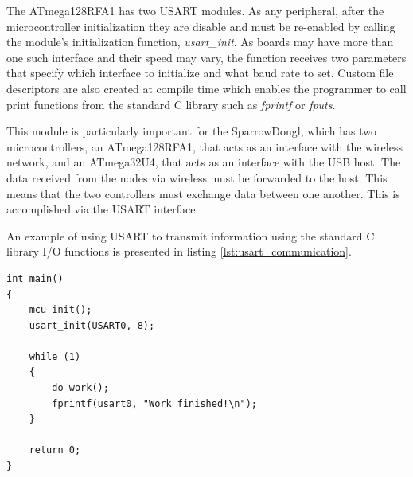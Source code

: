 The \mbox{ATmega128RFA1} has two USART modules. As any peripheral, after the
microcontroller initialization they are disable and must be re-enabled by
calling the module's initialization function, \emph{usart\_init}. As boards may
have more than one such interface and their speed may vary, the function
receives two parameters that specify which interface to initialize and what
baud rate to set. Custom file descriptors are also created at compile time
which enables the programmer to call print functions from the standard C
library such as \emph{fprintf} or \emph{fputs}.

This module is particularly important for the SparrowDongl, which has two
microcontrollers, an \mbox{ATmega128RFA1}, that acts as an interface with the
wireless network, and an \mbox{ATmega32U4}, that acts as an interface with the
USB host. The data received from the nodes via wireless must be forwarded to
the host. This means that the two controllers must exchange data between one
another. This is accomplished via the USART interface.

An example of using USART to transmit information using the standard C library
I/O functions is presented in listing \ref{lst:usart_communication}.

\lstset{
	language=C, numbers=none, caption=USART communication snippet,
	label=lst:usart_communication
}
\begin{lstlisting}
int main()
{
	mcu_init();
	usart_init(USART0, 8);

	while (1)
	{
		do_work();
		fprintf(usart0, "Work finished!\n");
	}

	return 0;
}
\end{lstlisting}

